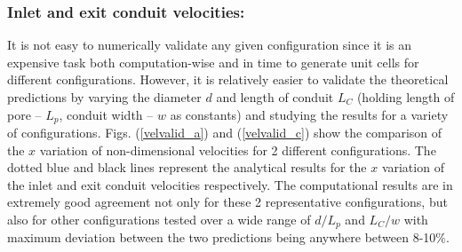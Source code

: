 \documentclass[twocolumn,10pt,cleanfoot]{ihmtc}
\begin{document}
\subsubsection*{Inlet and exit conduit velocities:} It is not easy to numerically validate any given configuration since it is an expensive task both computation-wise and in time to generate unit cells for different configurations. However, it is relatively easier to validate the theoretical predictions by varying the diameter $d$ and length of conduit $L_C$ (holding length of pore -- $L_p$, conduit width -- $w$ as constants) and studying the results for a variety of configurations. Figs. (\ref{velvalid_a}) and (\ref{velvalid_c}) show the comparison of the $x$ variation of non-dimensional velocities for 2 different configurations. The dotted blue and black lines represent the analytical results for the $ x $ variation of the inlet and exit conduit velocities respectively. The computational results are in extremely good agreement not only for these 2 representative configurations, but also for other configurations tested over a wide range of $d/L_p$ and $L_C/w$ with maximum deviation between the two predictions being anywhere between 8-10$\%$.
%
\end{document}
